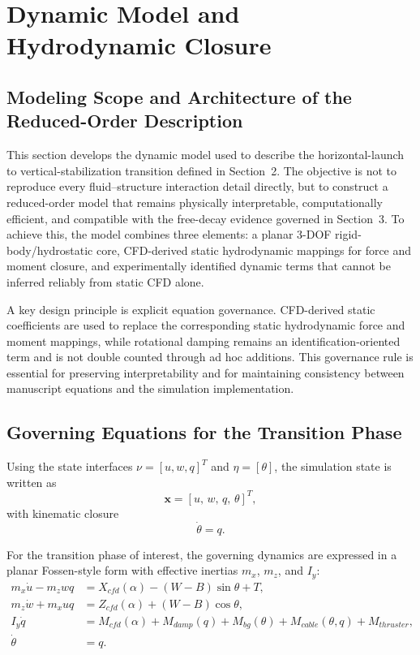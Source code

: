 \section{Dynamic Model and Hydrodynamic Closure}

\subsection{Modeling Scope and Architecture of the Reduced-Order Description}

This section develops the dynamic model used to describe the horizontal-launch to vertical-stabilization transition defined in Section~2. The objective is not to reproduce every fluid--structure interaction detail directly, but to construct a reduced-order model that remains physically interpretable, computationally efficient, and compatible with the free-decay evidence governed in Section~3. To achieve this, the model combines three elements: a planar 3-DOF rigid-body/hydrostatic core, CFD-derived static hydrodynamic mappings for force and moment closure, and experimentally identified dynamic terms that cannot be inferred reliably from static CFD alone.

A key design principle is explicit equation governance. CFD-derived static coefficients are used to replace the corresponding static hydrodynamic force and moment mappings, while rotational damping remains an identification-oriented term and is not double counted through ad hoc additions. This governance rule is essential for preserving interpretability and for maintaining consistency between manuscript equations and the simulation implementation.

\subsection{Governing Equations for the Transition Phase}

Using the state interfaces $\nu=[u,w,q]^T$ and $\eta=[\theta]$, the simulation state is written as
\[
\mathbf{x}=[u,\,w,\,q,\,\theta]^T,
\]
with kinematic closure
\[
\dot{\theta}=q.
\]

For the transition phase of interest, the governing dynamics are expressed in a planar Fossen-style form with effective inertias $m_x$, $m_z$, and $I_y$:
\[
\begin{aligned}
 m_x\dot{u}-m_zwq &= X_{cfd}(\alpha) - (W-B)\sin\theta + T, \\
 m_z\dot{w}+m_xuq &= Z_{cfd}(\alpha) + (W-B)\cos\theta, \\
 I_y\dot{q} &= M_{cfd}(\alpha) + M_{damp}(q) + M_{bg}(\theta) + M_{cable}(\theta,q) + M_{thruster}, \\
 \dot{\theta} &= q.
\end{aligned}
\]

